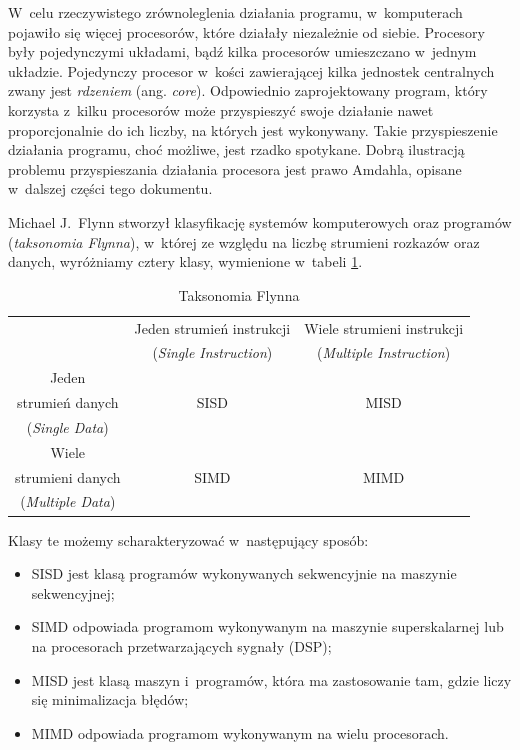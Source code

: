 \documentclass[11pt,makeidx]{mwart}
\begin{document}
%
\indent
	W~celu rzeczywistego zrównoleglenia działania programu, w~komputerach pojawiło się więcej procesorów,
	które działały niezależnie od siebie. Procesory były pojedynczymi układami, bądź kilka procesorów umieszczano w~jednym układzie. 
	Pojedynczy procesor w~kości zawierającej kilka jednostek centralnych zwany jest \emph{rdzeniem} (ang. \emph{core}).
	Odpowiednio zaprojektowany program,	który korzysta z~kilku procesorów może przyspieszyć swoje działanie nawet proporcjonalnie do ich liczby,
	na których jest wykonywany.	Takie przyspieszenie działania programu, choć możliwe, jest rzadko spotykane.
	Dobrą ilustracją problemu przyspieszania działania procesora jest prawo Amdahla, opisane w~dalszej części tego dokumentu.
\par
%
\indent
	Michael J.~Flynn stworzył klasyfikację systemów komputerowych oraz programów (\emph{taksonomia Flynna}), w~której ze względu na liczbę
	strumieni rozkazów oraz danych, wyróżniamy cztery klasy, wymienione w~tabeli \ref{tab:flynn}.
	\begin{table}[h]
	\centering
	\begin{tabular}{|c|c|c|} \hline
													 & Jeden strumień instrukcji	 & Wiele strumieni instrukcji \\
													 & (\emph{Single Instruction}) & (\emph{Multiple Instruction}) \\\hline
			Jeden                &     												 &      \\
			strumień danych      &  SISD										   & MISD 			\\
			(\emph{Single Data}) &                             & \\\hline
			Wiele                &     												 &      \\
			strumieni danych     & SIMD                        & MIMD \\
			(\emph{Multiple Data}) & 										 & 			\\\hline
	\end{tabular}
	\caption{Taksonomia Flynna}
	\label{tab:flynn}
	\end{table}
	Klasy te możemy scharakteryzować w~następujący sposób:
	\begin{itemize}
		\item SISD jest klasą programów wykonywanych sekwencyjnie na maszynie sekwencyjnej;
		\item SIMD odpowiada programom wykonywanym na maszynie superskalarnej lub na procesorach przetwarzających sygnały (DSP);
		\item MISD jest klasą maszyn i~programów, która ma zastosowanie tam, gdzie liczy się minimalizacja błędów;
		\item MIMD odpowiada programom wykonywanym na wielu procesorach.
	\end{itemize}
\end{document}
